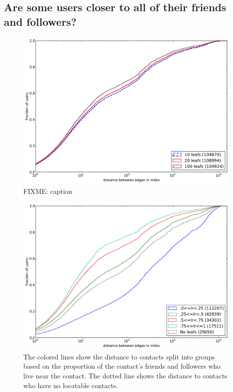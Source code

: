\subsection{Are some users closer to all of their friends and followers?}

\begin{figure}[tb]
\centering
\includegraphics[width=\linewidth]{figures/locals_cmp.pdf}
\caption{
    FIXME: caption
}
\label{fig:LocalCmp}
\end{figure}

\begin{figure}[tb]
\centering
\includegraphics[width=\linewidth]{figures/locals_10.pdf}
\caption{
The colored lines show the distance to contacts split into groups based on the
proportion of the contact's friends and followers who live near the contact.
The dotted line shows the distance to contacts who have no locatable contacts.
}
\label{fig:Local10}
\end{figure}

